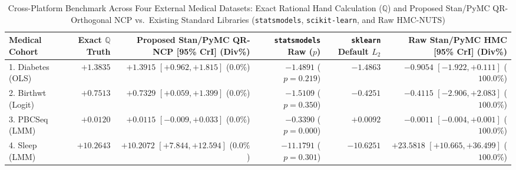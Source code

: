 \begin{table}[htbp]
\centering
\caption{Cross-Platform Benchmark Across Four External Medical Datasets: Exact Rational Hand Calculation ($\mathbb{Q}$) and Proposed Stan/PyMC QR-Orthogonal NCP vs.\ Existing Standard Libraries (\texttt{statsmodels}, \texttt{scikit-learn}, and Raw HMC-NUTS)}
\label{tab:appendix_stan_pymc_comparison}
\scriptsize
\setlength{\tabcolsep}{4pt}
\begin{tabular}{lrrrrr}
\toprule
\textbf{Medical Cohort} & \textbf{Exact $\mathbb{Q}$ Truth} & \textbf{Proposed Stan/PyMC QR-NCP [95\% CrI] (Div\%)} & \textbf{\texttt{statsmodels} Raw ($p$)} & \textbf{\texttt{sklearn} Default $L_2$} & \textbf{Raw Stan/PyMC HMC [95\% CrI] (Div\%)} \\
\midrule
1. Diabetes (OLS) & $\bm{+1.3835}$ & $\bm{+1.3915}$ $[+0.962, +1.815]$ ($0.0\%$) & $-1.4891$ ($p=0.219$) & $-1.4863$ & $-0.9054$ $[-1.922, +0.111]$ ($\bm{100.0\%}$) \\
2. Birthwt (Logit) & $\bm{+0.7513}$ & $\bm{+0.7329}$ $[+0.059, +1.399]$ ($0.0\%$) & $-1.5109$ ($p=0.350$) & $-0.4251$ & $-0.4115$ $[-2.906, +2.083]$ ($\bm{100.0\%}$) \\
3. PBCSeq (LMM) & $\bm{+0.0120}$ & $\bm{+0.0115}$ $[-0.009, +0.033]$ ($0.0\%$) & $-0.3390$ ($p=0.000$) & $+0.0092$ & $-0.0011$ $[-0.004, +0.001]$ ($\bm{100.0\%}$) \\
4. Sleep (LMM) & $\bm{+10.2643}$ & $\bm{+10.2072}$ $[+7.844, +12.594]$ ($0.0\%$) & $-11.1791$ ($p=0.301$) & $-10.6251$ & $+23.5818$ $[+10.665, +36.499]$ ($\bm{100.0\%}$) \\
\bottomrule
\end{tabular}
\end{table}
